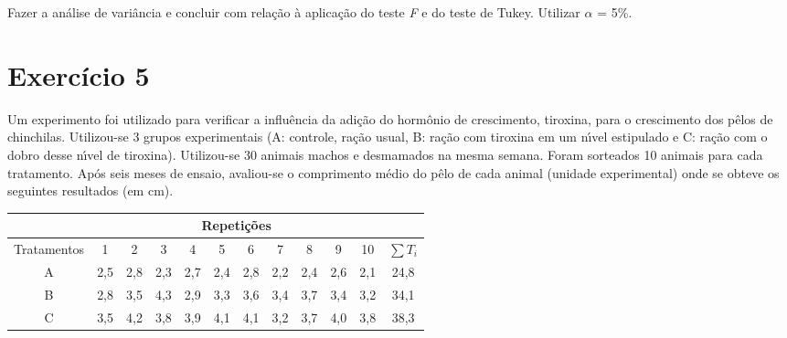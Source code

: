\documentclass[a4paper,11pt,twoside,openright]{report}
\begin{document}
Fazer a an\'{a}lise de vari\^{a}ncia e concluir com rela\c{c}\~{a}o \`{a} aplica\c{c}\~{a}o do teste \textit{F} e do teste de Tukey. 
Utilizar $\alpha$ = 5\%.

\section*{Exerc\'icio 5}
\hspace{0.5cm}Um experimento foi utilizado para verificar a influ\^{e}ncia da adi\c{c}\~{a}o do horm\^{o}nio de crescimento, tiroxina, para 
o crescimento dos p\^{e}los de chinchilas.   Utilizou-se 3 grupos experimentais (A: controle, ra\c{c}\~{a}o usual, B: ra\c{c}\~{a}o com tiroxina em um
 n\'{\i}vel estipulado e C: ra\c{c}\~{a}o com o dobro desse n\'{\i}vel de tiroxina).  Utilizou-se 30 animais machos e desmamados na mesma semana.  
Foram sorteados 10 animais para cada tratamento.  Ap\'{o}s seis meses de ensaio, avaliou-se o comprimento m\'{e}dio do p\^{e}lo de cada animal 
(unidade experimental) onde se obteve os seguintes resultados (em cm). 

\begin{center}
\begin{tabular}{l|l|l|l|l|l|l|l|l|l|l|l}
\hline
\multicolumn{1}{c}{} & \multicolumn{10}{c}{Repeti\c{c}\~{o}es} & \multicolumn{1}{c}{} \\ 
\hline
\multicolumn{1}{c|}{Tratamentos} & \multicolumn{1}{c|}{1} & \multicolumn{1}{c|}{2} & \multicolumn{1}{c|}{3} & \multicolumn{1}{c|}{4} & \multicolumn{1}{c|}{5} & \multicolumn{1}{c|}{6} & \multicolumn{1}{c|}{7} & \multicolumn{1}{c|}{8} & \multicolumn{1}{c|}{9} & \multicolumn{1}{c|}{10} & \multicolumn{1}{c}{ $\sum T_{i}$} \\ 
\hline
\multicolumn{1}{c|}{A} & \multicolumn{1}{c|}{2,5} & \multicolumn{1}{c|}{2,8} & \multicolumn{1}{c|}{2,3} & \multicolumn{1}{c|}{2,7} & \multicolumn{1}{c|}{2,4} & \multicolumn{1}{c|}{2,8} & \multicolumn{1}{c|}{2,2} & \multicolumn{1}{c|}{2,4} & \multicolumn{1}{c|}{2,6} & \multicolumn{1}{c|}{2,1} & \multicolumn{1}{c}{24,8} \\ 
\multicolumn{1}{c|}{B} & \multicolumn{1}{c|}{2,8} & \multicolumn{1}{c|}{3,5} & \multicolumn{1}{c|}{4,3} & \multicolumn{1}{c|}{2,9} & \multicolumn{1}{c|}{3,3} & \multicolumn{1}{c|}{3,6} & \multicolumn{1}{c|}{3,4} & \multicolumn{1}{c|}{3,7} & \multicolumn{1}{c|}{3,4} & \multicolumn{1}{c|}{3,2} & \multicolumn{1}{c}{34,1} \\ 
\multicolumn{1}{c|}{C} & \multicolumn{1}{c|}{3,5} & \multicolumn{1}{c|}{4,2} & \multicolumn{1}{c|}{3,8} & \multicolumn{1}{c|}{3,9} & \multicolumn{1}{c|}{4,1} & \multicolumn{1}{c|}{4,1} & \multicolumn{1}{c|}{3,2} & \multicolumn{1}{c|}{3,7} & \multicolumn{1}{c|}{4,0} & \multicolumn{1}{c|}{3,8} & \multicolumn{1}{c}{38,3} \\ 
\hline
\end{tabular}
\end{center}
\end{document}
